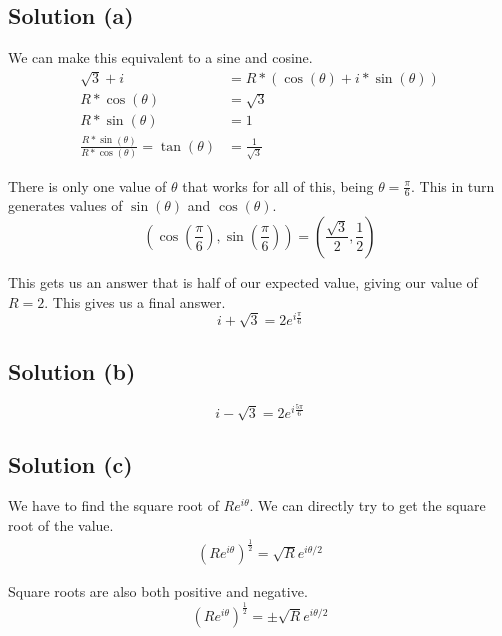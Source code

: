 \documentclass[12pt]{article}
\begin{document}
\subsection{Solution (a)}
We can make this equivalent to a sine and cosine.
\begin{align}
    \sqrt{3} + i    &=  R*(\cos(\theta) + i * \sin(\theta))\\
    R*\cos(\theta)  &=  \sqrt{3}\\
    R*\sin(\theta)  &=  1\\
    \frac{R*\sin(\theta)}{R*\cos(\theta)}   =   \tan(\theta)    &=  \frac{1}{\sqrt{3}}
\end{align}

There is only one value of $\theta$ that works for all of this, being $\theta = \frac{\pi}{6}$. 
This in turn generates values of $\sin(\theta)$ and $\cos(\theta)$.
\begin{equation}
    (\cos(\frac{\pi}{6}), \sin(\frac{\pi}{6}))  =   (\frac{\sqrt{3}}{2}, \frac{1}{2})
\end{equation}

This gets us an answer that is half of our expected value, giving our value of $R = 2$.
This gives us a final answer.
\begin{equation}
    i + \sqrt{3}    =   \boxed{2e^{i\frac{\pi}{6}}}
\end{equation}


\subsection{Solution (b)}
\begin{equation}
    i - \sqrt{3}    =   \boxed{2e^{i\frac{5\pi}{6}}}
\end{equation}


\subsection{Solution (c)}
We have to find the square root of $Re^{i\theta}$. 
We can directly try to get the square root of the value.
\begin{align}
    (Re^{i\theta})^{\frac{1}{2}} = \sqrt{R}e^{i\theta/2}
\end{align}

Square roots are also both positive and negative. 
\begin{equation}
    (Re^{i\theta})^{\frac{1}{2}} = \boxed{\pm\sqrt{R}e^{i\theta/2}}
\end{equation}
\end{document}
